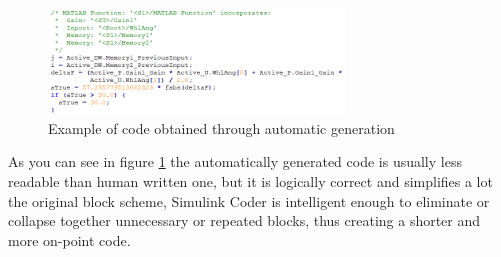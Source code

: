 \begin{figure} \label{Codegen Snippet}
		\centering
		\includegraphics[width=0.7\textwidth]{Images/Simulator/codegen-snippet}
		\caption{Example of code obtained through automatic generation}	
\end{figure}
As you can see in figure \ref{Codegen Snippet} the automatically generated code is usually less readable than human written one, but it is logically correct and simplifies a lot the original block scheme, Simulink Coder is intelligent enough to eliminate or collapse together unnecessary or repeated blocks, thus creating a shorter and more on-point code.
